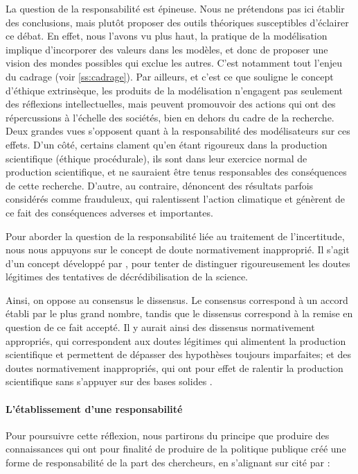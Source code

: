 La question de la responsabilité est épineuse. Nous ne prétendons pas ici établir des conclusions, mais plutôt proposer des outils théoriques susceptibles d'éclairer ce débat. En effet, nous l'avons vu plus haut, la pratique de la modélisation implique d'incorporer des valeurs dans les modèles, et donc de proposer une vision des mondes possibles qui exclue les autres. C'est notamment tout l'enjeu du cadrage (voir \ref{ss:cadrage}). Par ailleurs, et c'est ce que souligne le concept d'éthique extrinsèque, les produits de la modélisation n'engagent pas seulement des réflexions intellectuelles, mais peuvent promouvoir des actions qui ont des répercussions à l'échelle des sociétés, bien en dehors du cadre de la recherche. Deux grandes vues s'opposent quant à la responsabilité des modélisateurs sur ces effets. D'un côté, certains clament qu'en étant rigoureux dans la production scientifique (éthique procédurale), ils sont dans leur exercice normal de production scientifique, et ne sauraient être tenus responsables des conséquences de cette recherche. D'autre, au contraire, dénoncent des résultats parfois considérés comme frauduleux, qui ralentissent l'action climatique et génèrent de ce fait des conséquences adverses et importantes. 

Pour aborder la question de la responsabilité liée au  traitement de l'incertitude, nous nous appuyons sur le concept de doute normativement inapproprié. Il s'agit d'un concept développé par \textcite{melo-martin_fight_2018}, pour tenter de distinguer rigoureusement les doutes légitimes des tentatives de décrédibilisation de la science. 

Ainsi, on oppose au consensus le dissensus. Le consensus correspond à un accord établi par le plus grand nombre, tandis que le dissensus correspond à la remise en question de ce fait accepté. Il y aurait ainsi des dissensus normativement appropriés, qui correspondent aux doutes légitimes qui alimentent la production scientifique et permettent de dépasser des hypothèses toujours imparfaites; et des doutes normativement inappropriés, qui ont pour effet de ralentir la production scientifique sans s'appuyer sur des bases solides \autocite{benalloua_polemique_2023}. 

\paragraph{L'établissement d'une responsabilité}

Pour poursuivre cette réflexion, nous partirons du principe que produire des connaissances qui ont pour finalité de produire de la politique publique créé une forme de responsabilité de la part des chercheurs, en s'alignant sur \textcite{douglas_values_2014, douglas_science_2009} cité par \autocite{beck_epistemic_2016} : 


